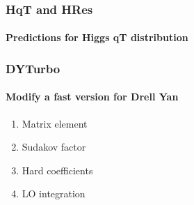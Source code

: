 \documentclass[aspectratio=43]{beamer}
\begin{document}
\begin{frame}

	\frametitle{HqT and HRes}
	\framesubtitle{Predictions for Higgs qT distribution}
	
\end{frame}

\begin{frame}

	\frametitle{DYTurbo}
	\framesubtitle{Modify a fast version for Drell Yan}

	\begin{enumerate}
		\item Matrix element
		\item Sudakov factor
		\item Hard coefficients
		\item LO integration
	\end{enumerate}

\end{frame}
\end{document}
